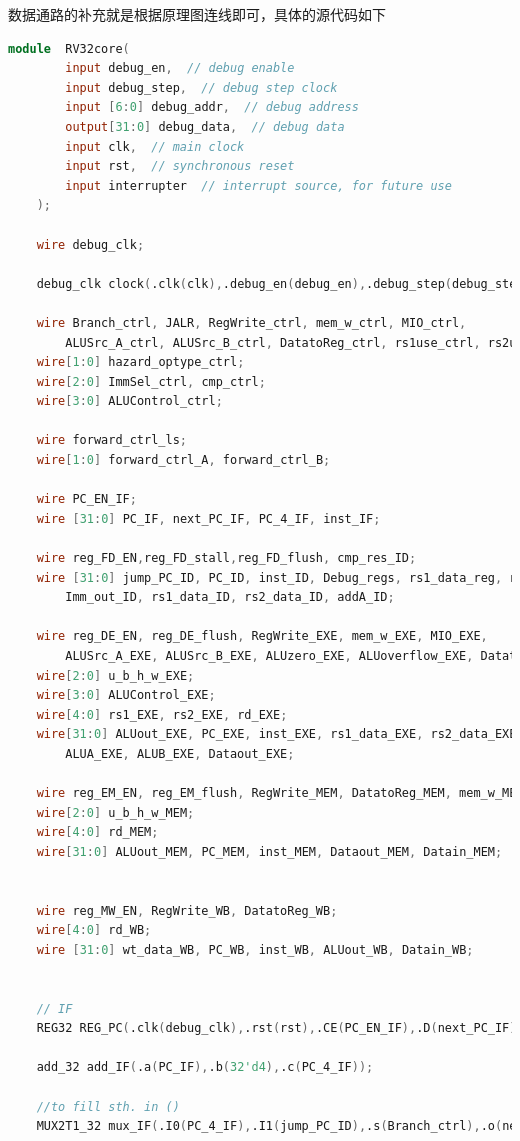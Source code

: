 数据通路的补充就是根据原理图连线即可，具体的源代码如下
\begin{lstlisting}[language = {verilog}]
module  RV32core(
        input debug_en,  // debug enable
        input debug_step,  // debug step clock
        input [6:0] debug_addr,  // debug address
        output[31:0] debug_data,  // debug data
        input clk,  // main clock
        input rst,  // synchronous reset
        input interrupter  // interrupt source, for future use
    );

    wire debug_clk;

    debug_clk clock(.clk(clk),.debug_en(debug_en),.debug_step(debug_step),.debug_clk(debug_clk));

    wire Branch_ctrl, JALR, RegWrite_ctrl, mem_w_ctrl, MIO_ctrl,
        ALUSrc_A_ctrl, ALUSrc_B_ctrl, DatatoReg_ctrl, rs1use_ctrl, rs2use_ctrl;
    wire[1:0] hazard_optype_ctrl;
    wire[2:0] ImmSel_ctrl, cmp_ctrl;
    wire[3:0] ALUControl_ctrl;

    wire forward_ctrl_ls;
    wire[1:0] forward_ctrl_A, forward_ctrl_B;

    wire PC_EN_IF;
    wire [31:0] PC_IF, next_PC_IF, PC_4_IF, inst_IF;

    wire reg_FD_EN,reg_FD_stall,reg_FD_flush, cmp_res_ID;
    wire [31:0] jump_PC_ID, PC_ID, inst_ID, Debug_regs, rs1_data_reg, rs2_data_reg,
        Imm_out_ID, rs1_data_ID, rs2_data_ID, addA_ID;
    
    wire reg_DE_EN, reg_DE_flush, RegWrite_EXE, mem_w_EXE, MIO_EXE,
        ALUSrc_A_EXE, ALUSrc_B_EXE, ALUzero_EXE, ALUoverflow_EXE, DatatoReg_EXE;
    wire[2:0] u_b_h_w_EXE;
    wire[3:0] ALUControl_EXE;
    wire[4:0] rs1_EXE, rs2_EXE, rd_EXE;
    wire[31:0] ALUout_EXE, PC_EXE, inst_EXE, rs1_data_EXE, rs2_data_EXE, Imm_EXE,
        ALUA_EXE, ALUB_EXE, Dataout_EXE;
    
    wire reg_EM_EN, reg_EM_flush, RegWrite_MEM, DatatoReg_MEM, mem_w_MEM, MIO_MEM;
    wire[2:0] u_b_h_w_MEM;
    wire[4:0] rd_MEM;
    wire[31:0] ALUout_MEM, PC_MEM, inst_MEM, Dataout_MEM, Datain_MEM;


    wire reg_MW_EN, RegWrite_WB, DatatoReg_WB;
    wire[4:0] rd_WB;
    wire [31:0] wt_data_WB, PC_WB, inst_WB, ALUout_WB, Datain_WB;


    // IF
    REG32 REG_PC(.clk(debug_clk),.rst(rst),.CE(PC_EN_IF),.D(next_PC_IF),.Q(PC_IF));
    
    add_32 add_IF(.a(PC_IF),.b(32'd4),.c(PC_4_IF));

    //to fill sth. in ()
    MUX2T1_32 mux_IF(.I0(PC_4_IF),.I1(jump_PC_ID),.s(Branch_ctrl),.o(next_PC_IF));        


\end{lstlisting}
